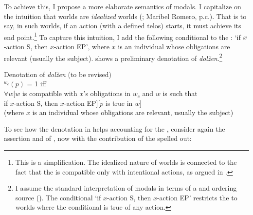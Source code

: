 \documentclass[output=paper,newtxmath,colorlinks,citecolor=brown]{langsci/langscibook}
\begin{document}
To achieve this, I propose a more elaborate semantics of  modals. I capitalize on the intuition that  worlds are \textit{idealized} worlds (\citealt{kra12}; Maribel Romero, p.c.). That is to say, in such worlds, if an action (with a defined telos) starts, it must achieve its end point.\footnote{This is a simplification. The idealized nature of  worlds is connected to the fact that the   is compatible only with intentional actions, as argued in \citet{gon18a}.}
To capture this intuition, I add the following conditional to the  : `if $x$-action S, then $x$-action EP', where $x$ is an individual whose obligations are relevant (usually the subject).  shows a preliminary denotation of  \textit{dolžen}.\footnote{I assume the standard interpretation of modals in terms of a  and ordering source (\citealt{kra91}). The conditional `if $x$-action S, then $x$-action EP' restricts the  to worlds where the conditional is true of any action.
}

\ea Denotation of \textit{dolžen} (to be revised) \\
	$^{w_c}(p)$ = 1 iff \\
    $\forall w$[$w$ is compatible with $x$'s obligations in $w_c$ and $w$ is such that \\
    if $x$-action S, then $x$-action EP][$p$ is true in $w$] \\
    (where $x$ is an individual whose obligations are relevant, usually the subject) \label{sxdolzhen}
        \z

\noindent To see how the denotation in  helps accounting for the , consider again the assertion and  of , now with the contribution of the  spelled out:

\ea \label{mb} 
 	\z \z
\end{document}
